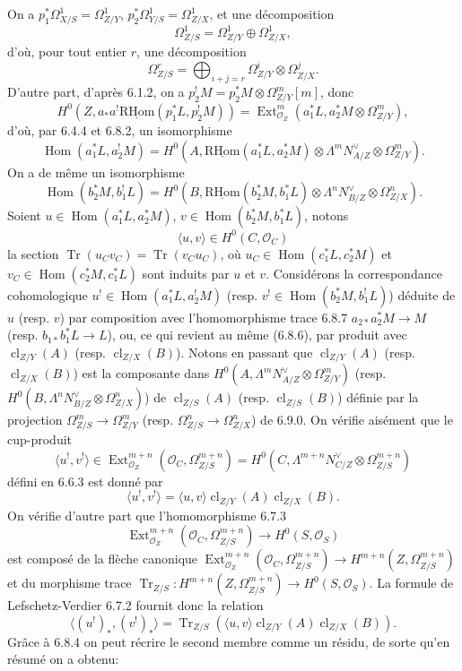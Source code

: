 \documentclass[11pt]{article}
\DeclareMathOperator{\Hom}{Hom}
\DeclareMathOperator{\Ext}{Ext}
\providecommand{\RHom}{\mathrm{RHom}}
\providecommand{\uRHom}{\underline{\RHom}}
\providecommand{\cl}{\operatorname{cl}}
\providecommand{\OO}{\mathcal{O}}
\providecommand{\RHom}{\mathrm{RHom}}
\providecommand{\Hom}{\operatorname{Hom}}
\providecommand{\RHom}{\mathrm R\mathcal{H}om}
\providecommand{\cl}{\operatorname{cl}}
\providecommand{\RHom}{\mathrm{RHom}}
\providecommand{\Hom}{\operatorname{Hom}}
\providecommand{\cl}{\operatorname{cl}}
\begin{document}
On a $p_1^*\Omega^1_{X/S}=\Omega^1_{Z/Y}$, $p_2^*\Omega^1_{Y/S}=\Omega^1_{Z/X}$, et une décomposition
\[
\Omega^1_{Z/S}=\Omega^1_{Z/Y}\oplus\Omega^1_{Z/X},
\]
d'où, pour tout entier $r$, une décomposition
\begin{equation}
\tag{6.9.0}
\Omega^r_{Z/S}=\bigoplus_{i+j=r}\Omega^i_{Z/Y}\otimes\Omega^j_{Z/X}.
\end{equation}
D'autre part, d'après 6.1.2, on a $p_2^!M=p_2^*M\otimes\Omega^m_{Z/Y}[m]$, donc
\[
H^0(Z,a_*a^!\uRHom(p_1^*L,p_2^!M))=\Ext^m_{\OO_Z}(a_1^*L,a_2^*M\otimes\Omega^m_{Z/Y}),
\]
d'où, par 6.4.4 et 6.8.2, un isomorphisme
\begin{equation}
\tag{6.9.1}
\Hom(a_1^*L,a_2^!M)=H^0(A,\uRHom(a_1^*L,a_2^*M)\otimes\Lambda^m N_{A/Z}^{\vee}\otimes\Omega^m_{Z/Y}).
\end{equation}
On a de même un isomorphisme
\begin{equation}
\tag{6.9.2}
\Hom(b_2^*M,b_1^!L)=H^0(B,\uRHom(b_2^*M,b_1^*L)\otimes\Lambda^n N_{B/Z}^{\vee}\otimes\Omega^n_{Z/X}).
\end{equation}
Soient $u\in\Hom(a_1^*L,a_2^*M)$, $v\in\Hom(b_2^*M,b_1^*L)$, notons
\begin{equation}
\tag{6.9.3}
\langle u,v\rangle\in H^0(C,\OO_C)
\end{equation}
la section $\operatorname{Tr}(u_Cv_C)=\operatorname{Tr}(v_Cu_C)$, où $u_C\in\Hom(c_1^*L,c_2^*M)$ et $v_C\in\Hom(c_2^*M,c_1^*L)$ sont induits par $u$ et $v$. Considérons la correspondance cohomologique $u^!\in\Hom(a_1^*L,a_2^!M)$ (resp. $v^!\in\Hom(b_2^*M,b_1^!L)$) déduite de $u$ (resp. $v$) par composition avec l'homomorphisme trace 6.8.7 $a_{2*}a_2^*M\to M$ (resp. $b_{1*}b_1^*L\to L$), ou, ce qui revient au même (6.8.6), par produit avec $\cl_{Z/Y}(A)$ (resp. $\cl_{Z/X}(B)$). Notons en passant que $\cl_{Z/Y}(A)$ (resp. $\cl_{Z/X}(B)$) est la composante dans $H^0(A,\Lambda^mN_{A/Z}^{\vee}\otimes\Omega^m_{Z/Y})$ (resp. $H^0(B,\Lambda^nN_{B/Z}^{\vee}\otimes\Omega^n_{Z/X})$) de $\cl_{Z/S}(A)$ (resp. $\cl_{Z/S}(B)$) définie par la projection $\Omega^m_{Z/S}\to\Omega^m_{Z/Y}$ (resp. $\Omega^n_{Z/S}\to\Omega^n_{Z/X}$) de 6.9.0. On vérifie aisément que le cup-produit
\[
\langle u^!,v^!\rangle\in\Ext^{m+n}_{\OO_Z}(\OO_C,\Omega^{m+n}_{Z/S})=H^0(C,\Lambda^{m+n}N_{C/Z}^{\vee}\otimes\Omega^{m+n}_{Z/S})
\]
défini en 6.6.3 est donné par
\begin{equation}
\tag{6.9.4}
\langle u^!,v^!\rangle=\langle u,v\rangle\cl_{Z/Y}(A)\cl_{Z/X}(B).
\end{equation}
On vérifie d'autre part que l'homomorphisme 6.7.3
\[
\Ext^{m+n}_{\OO_Z}(\OO_C,\Omega^{m+n}_{Z/S})\longrightarrow H^0(S,\OO_S)
\]
est composé de la flèche canonique $\Ext^{m+n}_{\OO_Z}(\OO_C,\Omega^{m+n}_{Z/S})\to H^{m+n}(Z,\Omega^{m+n}_{Z/S})$ et du morphisme trace $\operatorname{Tr}_{Z/S}:H^{m+n}(Z,\Omega^{m+n}_{Z/S})\to H^0(S,\OO_S)$. La formule de Lefschetz-Verdier 6.7.2 fournit donc la relation
\begin{equation}
\tag{6.9.5}
\langle (u^!)_*,(v^!)_*\rangle=\operatorname{Tr}_{Z/S}(\langle u,v\rangle\cl_{Z/Y}(A)\cl_{Z/X}(B)).
\end{equation}
Grâce à 6.8.4 on peut récrire le second membre comme un résidu, de sorte qu'en résumé on a obtenu:
\end{document}
